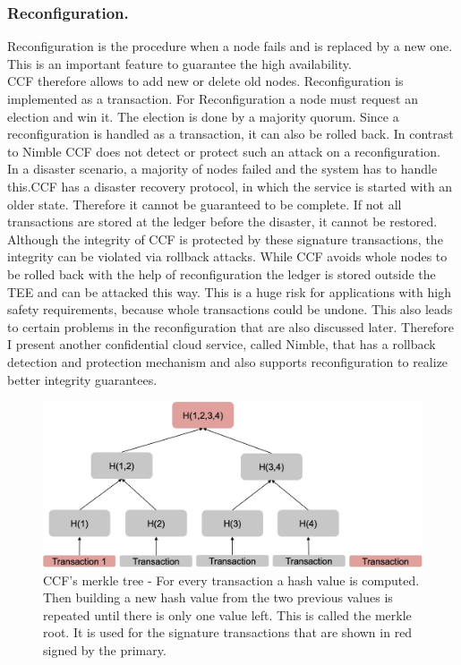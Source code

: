   \subsubsection*{Reconfiguration.}
  Reconfiguration is the procedure when a node fails and is replaced by a new one. This is an important feature to guarantee the high availability.\\
CCF therefore allows to add new or delete old nodes. Reconfiguration is implemented as a transaction. For Reconfiguration a node must request an election and win it. The election is done by a majority quorum. Since a reconfiguration is handled as a transaction, it can also be rolled back. In contrast to Nimble CCF does not detect or protect such an attack on a reconfiguration.\\%
In a disaster scenario, a majority of nodes failed and the system has to handle this.CCF has a disaster recovery protocol, in which the service is started with an older state. Therefore it cannot be guaranteed to be complete. If not all transactions are stored at the ledger before the disaster, it cannot be restored. \\
  Although the integrity of CCF is protected by these signature transactions, the integrity can be violated via rollback attacks. While CCF avoids whole nodes to be rolled back with the help of reconfiguration the ledger is stored outside the TEE and can be attacked this way. This is a huge risk for applications with high safety requirements, because whole transactions could be undone. This also leads to certain problems in the reconfiguration that are also discussed later. Therefore I present another confidential cloud service, called Nimble, that has a rollback detection and protection mechanism and also supports reconfiguration to realize better integrity guarantees.
 

\begin{figure}[t]
	\includegraphics[scale=0.18]{pictures/merkle_tree}
	\caption{CCF's merkle tree - For every transaction a hash value is computed. Then building a new hash value from the two previous values is repeated until there is only one value left. This is called the merkle root. It is used for the signature transactions that are shown in red signed by the primary.}
	\label{merkle}
\end{figure}



